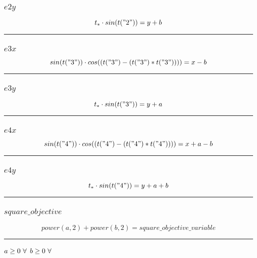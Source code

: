 \documentclass[11pt]{article}
\begin{document}
\subsubsection*{$e2y$}
\begin{equation}
t_{*} \cdot  sin(t("2"))  = y + b
\end{equation}
\vspace{5pt}
\hrule
\subsubsection*{$e3x$}
\begin{equation}
 sin(t("3"))  \cdot  cos((t("3") - (t("3") * t("3"))))  = x - b
\end{equation}
\vspace{5pt}
\hrule
\subsubsection*{$e3y$}
\begin{equation}
t_{*} \cdot  sin(t("3"))  = y + a
\end{equation}
\vspace{5pt}
\hrule
\subsubsection*{$e4x$}
\begin{equation}
 sin(t("4"))  \cdot  cos((t("4") - (t("4") * t("4"))))  = x + a - b
\end{equation}
\vspace{5pt}
\hrule
\subsubsection*{$e4y$}
\begin{equation}
t_{*} \cdot  sin(t("4"))  = y + a + b
\end{equation}
\vspace{5pt}
\hrule
\subsubsection*{$square\_objective$}
\begin{equation}
 power(a,2)  +  power(b,2)  = square\_objective\_variable
\end{equation}
\vspace{5pt}
\hrule
\bigskip
$a\geq 0 ~ \forall \\$
$b\geq 0 ~ \forall \\$
\end{document}
